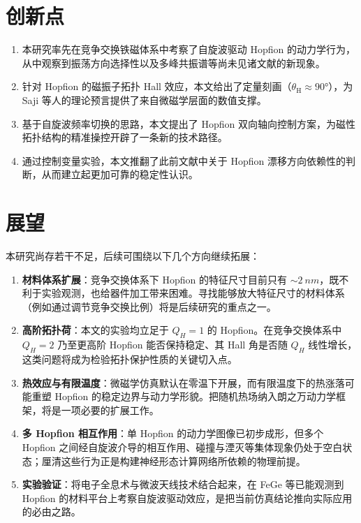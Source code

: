 \section{创新点}

\begin{enumerate}[label=(\arabic*)]
  \item 本研究率先在竞争交换铁磁体系中考察了自旋波驱动 Hopfion 的动力学行为，从中观察到振荡方向选择性以及多峰共振谱等尚未见诸文献的新现象。
  \item 针对 Hopfion 的磁振子拓扑 Hall 效应，本文给出了定量刻画（$\theta_{\text{H}} \approx \ang{90}$），为 Saji 等人的理论预言提供了来自微磁学层面的数值支撑。
  \item 基于自旋波频率切换的思路，本文提出了 Hopfion 双向轴向控制方案，为磁性拓扑结构的精准操控开辟了一条新的技术路径。
  \item 通过控制变量实验，本文推翻了此前文献中关于 Hopfion 漂移方向依赖性的判断，从而建立起更加可靠的稳定性认识。
\end{enumerate}


\section{展望}

本研究尚存若干不足，后续可围绕以下几个方向继续拓展：

\begin{enumerate}[label=(\arabic*)]
  \item \textbf{材料体系扩展}：竞争交换体系下 Hopfion 的特征尺寸目前只有 $\sim\SI{2}{nm}$，既不利于实验观测，也给器件加工带来困难。寻找能够放大特征尺寸的材料体系（例如通过调节竞争交换比例）将是后续研究的重点之一。
  \item \textbf{高阶拓扑荷}：本文的实验均立足于 $Q_H = 1$ 的 Hopfion。在竞争交换体系中 $Q_H = 2$ 乃至更高阶 Hopfion 能否保持稳定、其 Hall 角是否随 $Q_H$ 线性增长，这类问题将成为检验拓扑保护性质的关键切入点。
  \item \textbf{热效应与有限温度}：微磁学仿真默认在零温下开展，而有限温度下的热涨落可能重塑 Hopfion 的稳定边界与动力学形貌。把随机热场纳入朗之万动力学框架，将是一项必要的扩展工作。
  \item \textbf{多 Hopfion 相互作用}：单 Hopfion 的动力学图像已初步成形，但多个 Hopfion 之间经自旋波介导的相互作用、碰撞与湮灭等集体现象仍处于空白状态；厘清这些行为正是构建神经形态计算网络所依赖的物理前提。
  \item \textbf{实验验证}：将电子全息术与微波天线技术结合起来，在 FeGe 等已能观测到 Hopfion 的材料平台上考察自旋波驱动效应，是把当前仿真结论推向实际应用的必由之路。
\end{enumerate}
